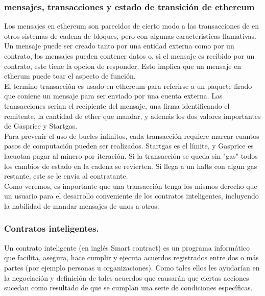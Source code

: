 \documentclass[11pt,a4paper]{article}
\begin{document}
\subsubsection{mensajes, transacciones y estado de transición de ethereum}

Los mensajes en ethereum son parecidos de cierto modo a las transacciones de en otros  sistemas de cadena de bloques, pero  con algunas caracteristicas llamativas. Un mensaje puede ser creado tanto por una entidad externa como por un contrato, los mensajes pueden contener datos o, si el mensaje es recibido por un contrato, este tiene la opcion de responder. Esto implica que un mensaje en etherum puede toar el aspecto de función.\\

El termino transacción es usado en  ethereum para referirse a un paquete firado que coniene un mensaje para ser enviado por una cuenta externa. Las transacciones serian el recipiente del mensaje, una firma identificando el remitente, la cantidad de ether que mandar, y además los dos valores importantes de Gasprice y Startgas.\\

Para prevenir el uso de bucles infinitos, cada transacción requiere marcar cuantos pasos de computación pueden ser realizados. Startgas es el límite, y Gasprice es lacuotaa pagar al minero por iteración. Si la transacción se queda sin "gas" todos los cambios de estado en la cadena se revierten. Si llega a un halts con algun gas restante, este se le envia al contratante. \\

Como veremos, es importante que una transacción tenga los mismos derecho que un usuario para el desarrollo conveniente de los contratos inteligentes, incluyendo la habilidad de mandar mensajes de unos a otros.\\


\subsubsection{Contratos inteligentes.}

Un contrato inteligente (en inglés Smart contract) es un programa informático que facilita, asegura, hace cumplir y ejecuta acuerdos registrados entre dos o más partes (por ejemplo personas u organizaciones). Como tales ellos les ayudarían en la negociación y definición de tales acuerdos que causarán que ciertas acciones sucedan como resultado de que se cumplan una serie de condiciones específicas.\\
\end{document}
